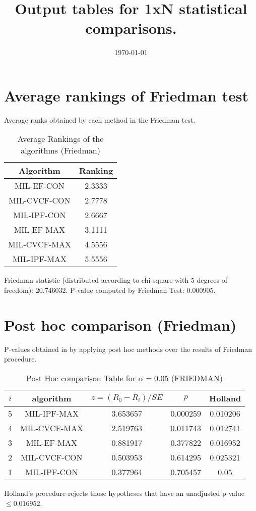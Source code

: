 \documentclass[a4paper,10pt]{article}
\title{Output tables for 1xN statistical comparisons.}
\author{}
\date{\today}
\begin{document}
\begin{landscape}
\pagestyle{empty}
\maketitle
\thispagestyle{empty}

\section{Average rankings of Friedman test}


Average ranks obtained by each method in the Friedman test.

\begin{table}[!htp]
\centering
\begin{tabular}{|c|c|}\hline
Algorithm&Ranking\\\hline
MIL-EF-CON&2.3333\\MIL-CVCF-CON&2.7778\\MIL-IPF-CON&2.6667\\MIL-EF-MAX&3.1111\\MIL-CVCF-MAX&4.5556\\MIL-IPF-MAX&5.5556\\\hline\end{tabular}
\caption{Average Rankings of the algorithms (Friedman)}
\end{table}

Friedman statistic (distributed according to chi-square with 5 degrees of freedom): 20.746032. \newline P-value computed by Friedman Test: 0.000905.\newline


\newpage

\section{Post hoc comparison (Friedman)}


P-values obtained in by applying post hoc methods over the results of Friedman procedure.

\begin{table}[!htp]
\centering\footnotesize
\begin{tabular}{ccccc}
$i$&algorithm&$z=(R_0 - R_i)/SE$&$p$&Holland\\
\hline5&MIL-IPF-MAX&3.653657&0.000259&0.010206\\4&MIL-CVCF-MAX&2.519763&0.011743&0.012741\\3&MIL-EF-MAX&0.881917&0.377822&0.016952\\2&MIL-CVCF-CON&0.503953&0.614295&0.025321\\1&MIL-IPF-CON&0.377964&0.705457&0.05\\\hline
\end{tabular}
\caption{Post Hoc comparison Table for $\alpha=0.05$ (FRIEDMAN)}
\end{table}Holland's procedure rejects those hypotheses that have an unadjusted p-value $\le0.016952$.



\end{landscape}
\end{document}
